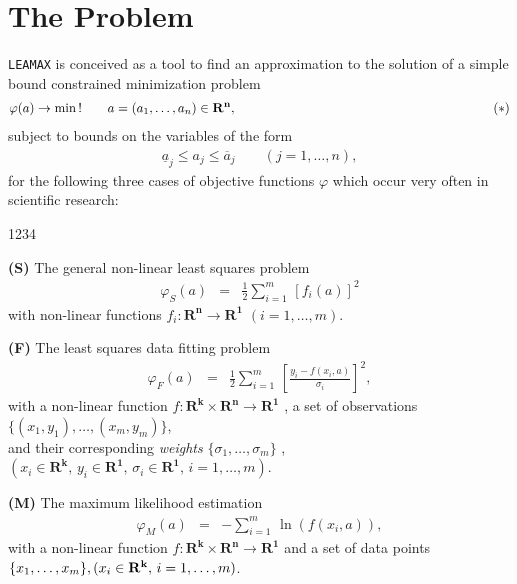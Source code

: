 \chapter{The Problem}

{\tt LEAMAX} is conceived as a tool to find an approximation to the
solution of a simple bound constrained minimization problem
\begin{eqnarray*}
\varphi(a) \to \min \,! \qquad a=(a_1,\ldots,a_n) \in \mathbf{R^n},
\hspace*{70mm} (*)
\end{eqnarray*}
\hspace{1cm} subject to bounds on the variables of the form
\begin{eqnarray*}
\underline{a}_j \le a_j \le \overline{a}_j \qquad (j=1,\ldots,n),
\end{eqnarray*}
for the following three cases of objective functions $\varphi$ which
occur very often in scientific research:
\begin{DL}{1234}
\item[{\bf (S)}]
The general non-linear least squares problem
 \begin{eqnarray*}
 \varphi_S(a) & = & \frac{1}{2} \sum_{i=1}^m\,\left[f_i(a)\right]^2
 \end{eqnarray*}
with non-linear functions
$f_i: \mathbf{R^n} \to \mathbf{R^1}$  $(i=1, \ldots ,m)$.  \\
\item[{\bf (F)}]
The least squares data fitting problem
\begin{eqnarray*}
\varphi_F (a) & = & \frac{1}{2} \sum_{i=1}^m \,
\left[ \frac{y_i - f(x_i,a)}{\sigma_i} \right]^2,
\end{eqnarray*}
with a non-linear function
$f: \mathbf{R^k} \times \mathbf{R^n} \to \mathbf{R^1}$ , a set of
observations $\{(x_1,y_1),\ldots,(x_m,y_m)\}$, \\
and their corresponding {\it weights}
$\{\sigma_1,\ldots,\sigma_m\}$ , $(x_i \in \mathbf{R^k} , \,
y_i \in \mathbf{R^1} , \, \sigma_i \in \mathbf{R^1} , \,i=1,\ldots,m)$.\\
\item[{\bf (M)}]
The maximum likelihood estimation
\begin{eqnarray*}
\varphi_M (a) & = & -\sum_{i=1}^m\,\ln( f(x_i,a)),
\end{eqnarray*}
with a non-linear function
$f: \mathbf{R^k} \times \mathbf{R^n} \to \mathbf{R^1}$  and a set of
data points $\{x_1,\ldots,x_m\}, \\
(x_i \in \mathbf{R^k}, \, i=1,\ldots,m )$.
\end{DL}

